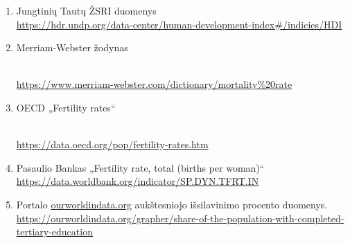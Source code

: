 \begin{enumerate}
    \item Jungtinių Tautų ŽSRI duomenys \\
    \href{https://hdr.undp.org/data-center/human-development-index\#/indicies/HDI}{https://hdr.undp.org/data-center/human-development-index\#/indicies/HDI}
    \item \hypertarget{merriam}{Merriam-Webster žodynas} \\
    \href{https://www.merriam-webster.com/dictionary/mortality\%20rate}{https://www.merriam-webster.com/dictionary/mortality\%20rate}
    \item \hypertarget{oecd}{OECD „Fertility rates“} \\
    \href{https://data.oecd.org/pop/fertility-rates.htm}{https://data.oecd.org/pop/fertility-rates.htm}
    \item Pasaulio Bankas „Fertility rate, total (births per woman)“ \\
    \href{https://data.worldbank.org/indicator/SP.DYN.TFRT.IN}{https://data.worldbank.org/indicator/SP.DYN.TFRT.IN}
    \item Portalo \url{ourworldindata.org} aukštesniojo išsilavinimo procento duomenys. \\
    \href{https://ourworldindata.org/grapher/share-of-the-population-with-completed-tertiary-education}{https://ourworldindata.org/grapher/share-of-the-population-with-completed-tertiary-education}
\end{enumerate}

